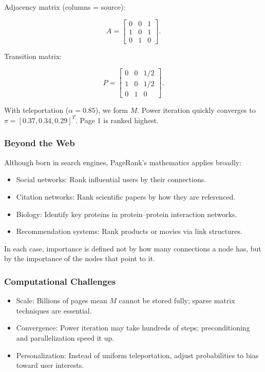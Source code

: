 \documentclass[
  letterpaper,
  DIV=11,
  numbers=noendperiod]{scrreprt}
\providecommand{\tightlist}{%
  \setlength{\itemsep}{0pt}\setlength{\parskip}{0pt}}
\begin{document}
Adjacency matrix (columns = source):

\[
A = \begin{bmatrix} 
0 & 0 & 1 \\ 
1 & 0 & 1 \\ 
0 & 1 & 0 
\end{bmatrix}.
\]

Transition matrix:

\[
P = \begin{bmatrix} 
0 & 0 & 1/2 \\ 
1 & 0 & 1/2 \\ 
0 & 1 & 0 
\end{bmatrix}.
\]

With teleportation (\(\alpha=0.85\)), we form \(M\). Power iteration
quickly converges to \(\pi = [0.37, 0.34, 0.29]^T\). Page 1 is ranked
highest.

\subsubsection{Beyond the Web}\label{beyond-the-web}

Although born in search engines, PageRank's mathematics applies broadly:

\begin{itemize}
\tightlist
\item
  Social networks: Rank influential users by their connections.
\item
  Citation networks: Rank scientific papers by how they are referenced.
\item
  Biology: Identify key proteins in protein--protein interaction
  networks.
\item
  Recommendation systems: Rank products or movies via link structures.
\end{itemize}

In each case, importance is defined not by how many connections a node
has, but by the importance of the nodes that point to it.

\subsubsection{Computational Challenges}\label{computational-challenges}

\begin{itemize}
\tightlist
\item
  Scale: Billions of pages mean \(M\) cannot be stored fully; sparse
  matrix techniques are essential.
\item
  Convergence: Power iteration may take hundreds of steps;
  preconditioning and parallelization speed it up.
\item
  Personalization: Instead of uniform teleportation, adjust
  probabilities to bias toward user interests.
\end{itemize}
\end{document}
